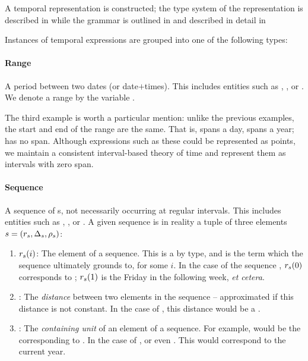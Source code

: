 A temporal representation is constructed; the type system of the representation
	is described in  while the grammar is outlined in
	 and described in detail in 

Instances of temporal expressions are grouped into one of the following types:
\paragraph{Range}
A period between two dates (or date$+$times).
This includes entities such as , , or
	.
We denote a range by the variable \range.

The third example is worth a particular mention:
	unlike the previous examples, the start and end of the range are the same.
That is,  spans a day,  spans a year;  has no span.
Although expressions such as these could be represented as points,
	we maintain a consistent interval-based theory of time
	\cite{key:1981allen-temporal} and represent them as intervals with
	zero span.

\paragraph{Sequence}
A sequence of s, not necessarily occurring at regular intervals.
This includes entities such as , , or
	.
A given sequence is in reality a tuple of three elements
	$s=(r_s,\Delta_s,\rho_s)$:
\begin{enumerate}
	\item $r_s(i)$: 
		The  element of a sequence.
		This is a  by type, and is the term which the sequence ultimately
			grounds to, for some $i$.
		In the case of the sequence , $r_s(0)$ corresponds to
			; 
			$r_s(1)$ is the Friday in the following week, \textit{et cetera}.
	\item \seqjump:
		The \textit{distance} between two elements in the sequence -- approximated
			if this distance is not constant.
		In the case of , this distance would be a .
	\item \seqcanon:
		The \textit{containing unit} of an element of a sequence.
		For example,  would be the 
			corresponding to .
		In the case of , or even . This 
			would correspond to the current year.
\end{enumerate}

